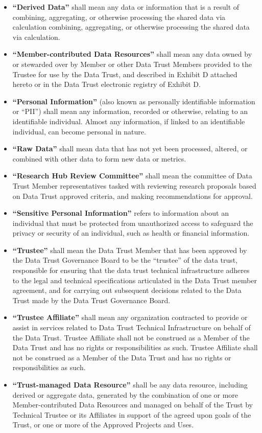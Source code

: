 \documentclass[]{book}
\begin{document}
\begin{itemize}
\item
  \textbf{``Derived Data''} shall mean any data or information that is a result of combining, aggregating, or otherwise processing the shared data via calculation combining, aggregating, or otherwise processing the shared data via calculation.
\item
  \textbf{``Member-contributed Data Resources''} shall mean any data owned by or stewarded over by Member or other Data Trust Members provided to the Trustee for use by the Data Trust, and described in Exhibit D attached hereto or in the Data Trust electronic registry of Exhibit D.
\item
  \textbf{``Personal Information''} (also known as personally identifiable information or ``PII'') shall mean any information, recorded or otherwise, relating to an identifiable individual. Almost any information, if linked to an identifiable individual, can become personal in nature.
\item
  \textbf{``Raw Data''} shall mean data that has not yet been processed, altered, or combined with other data to form new data or metrics.
\item
  \textbf{``Research Hub Review Committee''} shall mean the committee of Data Trust Member representatives tasked with reviewing research proposals based on Data Trust approved criteria, and making recommendations for approval.
\item
  \textbf{``Sensitive Personal Information''} refers to information about an individual that must be protected from unauthorized access to safeguard the privacy or security of an individual, such as health or financial information.
\item
  \textbf{``Trustee''} shall mean the Data Trust Member that has been approved by the Data Trust Governance Board to be the ``trustee'' of the data trust, responsible for ensuring that the data trust technical infrastructure adheres to the legal and technical specifications articulated in the Data Trust member agreement, and for carrying out subsequent decisions related to the Data Trust made by the Data Trust Governance Board.
\item
  \textbf{``Trustee Affiliate''} shall mean any organization contracted to provide or assist in services related to Data Trust Technical Infrastructure on behalf of the Data Trust. Trustee Affiliate shall not be construed as a Member of the Data Trust and has no rights or responsibilities as such. Trustee Affiliate shall not be construed as a Member of the Data Trust and has no rights or responsibilities as such.
\item
  \textbf{``Trust-managed Data Resource''} shall be any data resource, including derived or aggregate data, generated by the combination of one or more Member-contributed Data Resources and managed on behalf of the Trust by Technical Trustee or its Affiliates in support of the agreed upon goals of the Trust, or one or more of the Approved Projects and Uses.
\end{itemize}
\end{document}
